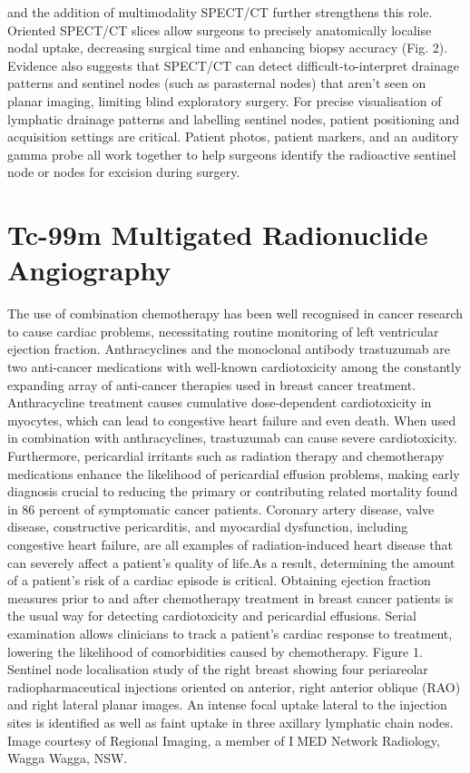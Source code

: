 \documentclass{article}
\begin{document}
and the addition of multimodality SPECT/CT further strengthens this role. Oriented 
SPECT/CT slices allow surgeons to precisely anatomically localise nodal uptake, decreasing 
surgical time and enhancing biopsy accuracy (Fig. 2). Evidence also suggests that SPECT/CT 
can detect difficult-to-interpret drainage patterns and sentinel nodes (such as parasternal 
nodes) that aren't seen on planar imaging, limiting blind exploratory surgery. For precise 
visualisation of lymphatic drainage patterns and labelling sentinel nodes, patient positioning 
and acquisition settings are critical. Patient photos, patient markers, and an auditory gamma 
probe all work together to help surgeons identify the radioactive sentinel node or nodes for 
excision during surgery.
\section{Tc-99m Multigated Radionuclide Angiography}
The use of combination chemotherapy has been well recognised in cancer research to cause 
cardiac problems, necessitating routine monitoring of left ventricular ejection fraction. 
Anthracyclines and the monoclonal antibody trastuzumab are two anti-cancer medications 
with well-known cardiotoxicity among the constantly expanding array of anti-cancer 
therapies used in breast cancer treatment. Anthracycline treatment causes cumulative 
dose-dependent cardiotoxicity in myocytes, which can lead to congestive heart failure and 
even death. When used in combination with anthracyclines, trastuzumab can cause severe 
cardiotoxicity. Furthermore, pericardial irritants such as radiation therapy and 
chemotherapy medications enhance the likelihood of pericardial effusion problems, making 
early diagnosis crucial to reducing the primary or contributing related mortality found in 86 
percent of symptomatic cancer patients.
Coronary artery disease, valve disease, constructive pericarditis, and myocardial 
dysfunction, including congestive heart failure, are all examples of radiation-induced heart 
disease that can severely affect a patient's quality of life.As a result, determining the 
amount of a patient's risk of a cardiac episode is critical. Obtaining ejection fraction 
measures prior to and after chemotherapy treatment in breast cancer patients is the usual 
way for detecting cardiotoxicity and pericardial effusions. Serial examination allows 
clinicians to track a patient's cardiac response to treatment, lowering the likelihood of 
comorbidities caused by chemotherapy.
Figure 1. Sentinel node localisation study of the right breast showing four periareolar 
radiopharmaceutical injections oriented on anterior, right anterior oblique (RAO) and right lateral 
planar images. An intense focal uptake lateral to the injection sites is identified as well as faint 
uptake in three axillary lymphatic chain nodes. Image courtesy of Regional Imaging, a member of IMED Network Radiology, Wagga Wagga, NSW.
\end{document}

